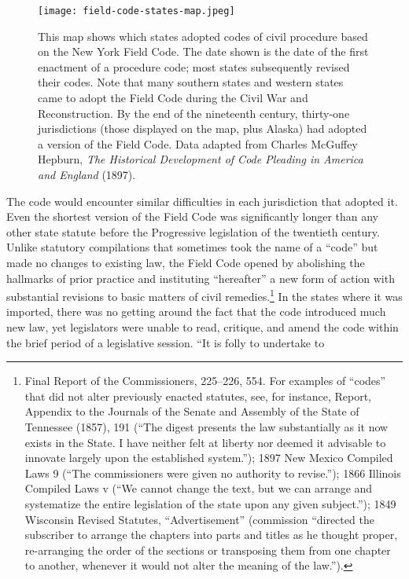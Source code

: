 \documentclass[12pt,]{article}
\let\rmarkdownfootnote\footnote%
\def\footnote{\protect\rmarkdownfootnote}
\begin{document}
\begin{figure}
\centering
\texttt{[image: field-code-states-map.jpeg]}
\caption{This map shows which states adopted codes of civil procedure
based on the New York Field Code. The date shown is the date of the
first enactment of a procedure code; most states subsequently revised
their codes. Note that many southern states and western states came to
adopt the Field Code during the Civil War and Reconstruction. By the end
of the nineteenth century, thirty-one jurisdictions (those displayed on
the map, plus Alaska) had adopted a version of the Field Code. Data
adapted from Charles McGuffey Hepburn, \emph{The Historical Development
of Code Pleading in America and England} (1897).}
\end{figure}

The code would encounter similar difficulties in each jurisdiction that
adopted it. Even the shortest version of the Field Code was
significantly longer than any other state statute before the Progressive
legislation of the twentieth century. Unlike statutory compilations that
sometimes took the name of a ``code'' but made no changes to existing
law, the Field Code opened by abolishing the hallmarks of prior practice
and instituting ``hereafter'' a new form of action with substantial
revisions to basic matters of civil remedies.\footnote{Final Report of
  the Commissioners, 225--226, 554. For examples of ``codes'' that did
  not alter previously enacted statutes, see, for instance, Report,
  Appendix to the Journals of the Senate and Assembly of the State of
  Tennessee (1857), 191 (``The digest presents the law substantially as
  it now exists in the State. I have neither felt at liberty nor deemed
  it advisable to innovate largely upon the established system.''); 1897
  New Mexico Compiled Laws 9 (``The commissioners were given no
  authority to revise.''); 1866 Illinois Compiled Laws v (``We cannot
  change the text, but we can arrange and systematize the entire
  legislation of the state upon any given subject.''); 1849 Wisconsin
  Revised Statutes, ``Advertisement'' (commission ``directed the
  subscriber to arrange the chapters into parts and titles as he thought
  proper, re-arranging the order of the sections or transposing them
  from one chapter to another, whenever it would not alter the meaning
  of the law.'').} In the states where it was imported, there was no
getting around the fact that the code introduced much new law, yet
legislators were unable to read, critique, and amend the code within the
brief period of a legislative session. ``It is folly to undertake to
\end{document}
